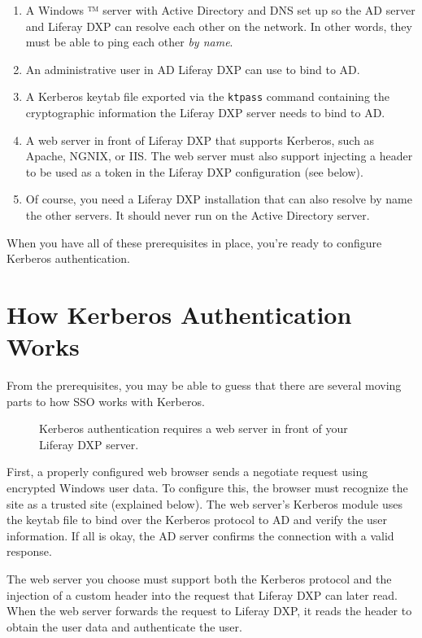 \begin{enumerate}
\def\labelenumi{\arabic{enumi}.}
\item
  A Windows ™ server with Active Directory and DNS set up so the AD
  server and Liferay DXP can resolve each other on the network. In other
  words, they must be able to ping each other \emph{by name}.
\item
  An administrative user in AD Liferay DXP can use to bind to AD.
\item
  A Kerberos keytab file exported via the \texttt{ktpass} command
  containing the cryptographic information the Liferay DXP server needs
  to bind to AD.
\item
  A web server in front of Liferay DXP that supports Kerberos, such as
  Apache, NGNIX, or IIS. The web server must also support injecting a
  header to be used as a token in the Liferay DXP configuration (see
  below).
\item
  Of course, you need a Liferay DXP installation that can also resolve
  by name the other servers. It should never run on the Active Directory
  server.
\end{enumerate}

When you have all of these prerequisites in place, you're ready to
configure Kerberos authentication.

\section{How Kerberos Authentication
Works}\label{how-kerberos-authentication-works}

From the prerequisites, you may be able to guess that there are several
moving parts to how SSO works with Kerberos.

\begin{figure}
\centering
{}
\caption{Kerberos authentication requires a web server in front of your
Liferay DXP server.}
\end{figure}

First, a properly configured web browser sends a negotiate request using
encrypted Windows user data. To configure this, the browser must
recognize the site as a trusted site (explained below). The web server's
Kerberos module uses the keytab file to bind over the Kerberos protocol
to AD and verify the user information. If all is okay, the AD server
confirms the connection with a valid response.

The web server you choose must support both the Kerberos protocol and
the injection of a custom header into the request that Liferay DXP can
later read. When the web server forwards the request to Liferay DXP, it
reads the header to obtain the user data and authenticate the user.

